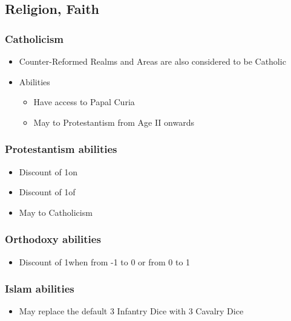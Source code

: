 \documentclass[10pt]{article}
\begin{document}
\subsection*{Religion, Faith }
\subsubsection*{Catholicism}
\begin{itemize}
	\item Counter-Reformed Realms and Areas are also considered to be Catholic
	\item Abilities
	\begin{itemize}
		\item Have access to Papal Curia
		\item May  to Protestantism from Age II onwards
	\end{itemize}
\end{itemize}

\subsubsection*{Protestantism abilities}
\begin{itemize}
	\item Discount of 1\adminpower on 
	\item Discount of 1\adminpower of 
	\item May  to Catholicism
\end{itemize}

\subsubsection*{Orthodoxy abilities}
\begin{itemize}
	\item Discount of 1\adminpower when  from -1 to 0 or from 0 to 1
\end{itemize}

\subsubsection*{Islam abilities}
\begin{itemize}
	\item May replace the default 3 Infantry Dice with 3 Cavalry Dice
\end{itemize}
\end{document}
